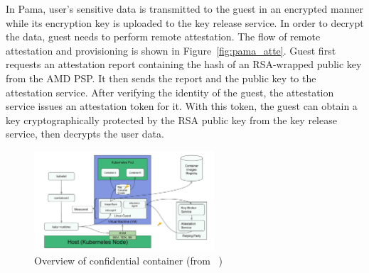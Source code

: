 In Pama, user's sensitive data is transmitted to the guest in an encrypted manner while its encryption key is uploaded to the key release service. In order to decrypt the data, guest needs to perform remote attestation. The flow of remote attestation and provisioning 
is shown in Figure~\ref{fig:pama_atte}. Guest first requests an attestation report containing the hash of an RSA-wrapped public key from the AMD PSP. It then sends the report and the public key to the attestation service. After verifying the identity of the guest, the attestation service issues an 
attestation token for it. With this token, the guest can obtain a key cryptographically protected by the RSA public key from the key release service, then decrypts the user data.

 
\begin{figure}[htp]
    \centering
    \includegraphics[width=0.6\textwidth]{images/confidentail_kata.png}
    \caption[Overview of confidential container]{Overview of confidential container (from ~\cite*{confidential_kata})}
    \label{fig:confidentail_kata}
\end{figure}

